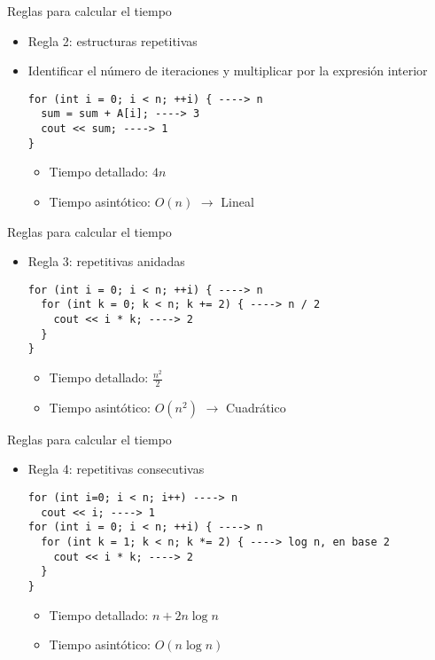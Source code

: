 \documentclass[aspectratio=169]{beamer}
\begin{document}
\begin{frame}[fragile]{Reglas para calcular el tiempo}
  \begin{itemize}
    \item Regla 2: estructuras repetitivas
    \item Identificar el número de iteraciones y multiplicar por la expresión interior
    \begin{lstlisting}
for (int i = 0; i < n; ++i) { ----> n
  sum = sum + A[i]; ----> 3
  cout << sum; ----> 1
}
    \end{lstlisting}
    \begin{itemize}
      \item Tiempo detallado: $4n$
      \item Tiempo asintótico: $O(n)$ $\longrightarrow$ Lineal
    \end{itemize}
  \end{itemize}
\end{frame}


\begin{frame}[fragile]{Reglas para calcular el tiempo}
  \begin{itemize}
    \item Regla 3: repetitivas anidadas
    \begin{lstlisting}
for (int i = 0; i < n; ++i) { ----> n
  for (int k = 0; k < n; k += 2) { ----> n / 2
    cout << i * k; ----> 2
  }
}
    \end{lstlisting}
    \begin{itemize}
      \item Tiempo detallado: $\frac{n^2}{2}$
      \item Tiempo asintótico: $O(n^2)$ $\longrightarrow$ Cuadrático
    \end{itemize}
  \end{itemize}
\end{frame}

\begin{frame}[fragile]{Reglas para calcular el tiempo}
  \begin{itemize}
    \item Regla 4: repetitivas consecutivas
    \begin{lstlisting}
for (int i=0; i < n; i++) ----> n
  cout << i; ----> 1
for (int i = 0; i < n; ++i) { ----> n
  for (int k = 1; k < n; k *= 2) { ----> log n, en base 2
    cout << i * k; ----> 2
  }
}
    \end{lstlisting}
    \begin{itemize}
      \item Tiempo detallado: $ n + 2n\log n$
      \item Tiempo asintótico: $O(n\log n)$
    \end{itemize}
  \end{itemize}
\end{frame}
\end{document}
